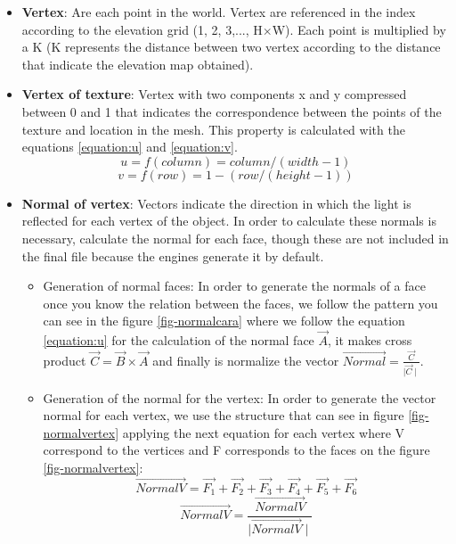 \documentclass[10pt,a4paper,twocolumn,twoside]{article}
\begin{document}
\begin{itemize}
\setlength\itemsep{0em}
  \item \textbf{Vertex}: Are each point in the world. Vertex are referenced in the index according to the elevation grid (1, 2, 3,..., H$\times$W). Each point is multiplied by a K (K represents the distance between two vertex according to the distance that indicate the elevation map obtained).

  \item {
    \textbf{Vertex of texture}: Vertex with two components x and y compressed between 0 and 1 that indicates the correspondence between the points of the texture and location in the mesh. This property is calculated with the equations \ref{equation:u} and \ref{equation:v}.
    \begin{equation}
    \label{equation:u}
    u = f(column) = column / (width - 1)
    \end{equation}
    \begin{equation}
    \label{equation:v}
    v = f(row) = 1 - (row / (height - 1))
    \end{equation}
  }

\vspace{-0.5cm}
  \item \textbf{Normal of vertex}: Vectors indicate the direction in which the light is reflected for each vertex of the object. In order to calculate these normals is necessary, calculate the normal for each face, though these are not included in the final file because the engines generate it by default.

  \begin{itemize}
  \setlength\itemsep{0em}
    \item {
      Generation of normal faces: In order to generate the normals of a face once you know the relation between the faces, we follow the pattern you can see in the figure \ref{fig-normalcara} where we follow the equation \ref{equation:u} for the calculation of the normal face $\vec{A}$, it makes cross product $\vec{C} = \vec{B}\times\vec{A}$ and finally is normalize the vector $\vec{Normal} = \frac{\vec{C}}{\mid\vec{C}\mid}$.
    }

    \item {
    Generation of the normal for the vertex: In order to generate the vector normal for each vertex, we use the structure that can see in figure \ref{fig-normalvertex} applying the next equation for each vertex where V correspond to the vertices and F corresponds to the faces on the figure \ref{fig-normalvertex}:
      \begin{equation}
      \vec{NormalV} = \vec{F_1} + \vec{F_2} + \vec{F_3} + \vec{F_4} + \vec{F_5} + \vec{F_6}
      \end{equation}
      \begin{equation}
      \vec{NormalV} = \frac{\vec{NormalV}}{\mid\vec{NormalV}\mid}
      \end{equation}
    }
  \end{itemize}


\end{itemize}
\end{document}
